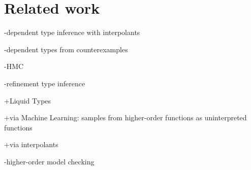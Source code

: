 \section{Related work}
\label{s:relwk}

-dependent type inference with interpolants~\cite{unno09}

-dependent types from counterexamples~\cite{terauchi10}

-HMC~\cite{jhala11}

-refinement type inference

  +Liquid Types

  +via Machine Learning: samples from higher-order functions as
   uninterpreted functions

  +via interpolants

-higher-order model checking
